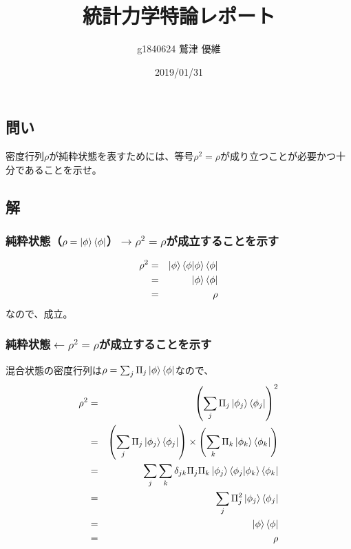 \documentclass[10pt]{ujarticle}
\title{統計力学特論レポート}
\author{g1840624 鷲津 優維}
\date{2019/01/31}
\begin{document}
\maketitle
\section{}
\subsection{問い}
密度行列$\rho$が純粋状態を表すためには、等号$\rho^2 = \rho$が成り立つことが必要かつ十分であることを示せ。

\subsection{解}
\subsubsection{純粋状態（$\rho = \ket{\phi}\bra{\phi}$）$\to \rho^2 = \rho$が成立することを示す}
\begin{eqnarray*}
  \rho^2 &=& \ket{\phi} \braket{\phi|\phi} \bra{\phi}\\
  &=& \ket{\phi} \bra{\phi}\\
  &=& \rho
\end{eqnarray*}
なので、成立。

\subsubsection{純粋状態$\gets \rho^2 = \rho$が成立することを示す}
混合状態の密度行列は$\rho = \sum_j \Pi_j \ket{\phi} \bra{\phi}$なので、
\begin{eqnarray*}
  \rho^2 &=& \left( \sum_j \Pi_j \ket{\phi_j} \bra{\phi_j} \right)^2 \\
  &=& \left( \sum_j \Pi_j \ket{\phi_j} \bra{\phi_j} \right) \times \left( \sum_k \Pi_k \ket{\phi_k} \bra{\phi_k} \right) \\
  &=& \sum_j \sum_k \delta_{jk} \Pi_j \Pi_k \ket{\phi_j}\braket{\phi_j|\phi_k}\bra{\phi_k}\\
  &=& \sum_j \Pi_j^2 \ket{\phi_j} \bra{\phi_j}\\
  &=& \ket{\phi} \bra{\phi}\\
  &=& \rho
\end{eqnarray*}

\section{}
\end{document}
